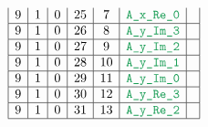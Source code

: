 \begin{figure}[h!]
\begin{adjustwidth}{-2cm}{-2cm}
{\[\begin{array}{|c|c|c|c|c|c|c|}
                    9                      & 1                                       & 0                                         & 25                     & 7                   & \locAXReZero  &                                                                                                                                                                   \\ \hline
                    9                      & 1                                       & 0                                         & 26                     & 8                   & \locAYImThree &                                                                                                                                                                   \\ \hline
                    9                      & 1                                       & 0                                         & 27                     & 9                   & \locAYImTwo   &                                                                                                                                                                   \\ \hline
                    9                      & 1                                       & 0                                         & 28                     & 10                  & \locAYImOne   &                                                                                                                                                                   \\ \hline
                    9                      & 1                                       & 0                                         & 29                     & 11                  & \locAYImZero  &                                                                                                                                                                   \\ \hline
                    9                      & 1                                       & 0                                         & 30                     & 12                  & \locAYReThree &                                                                                                                                                                   \\ \hline
                    9                      & 1                                       & 0                                         & 31                     & 13                  & \locAYReTwo   &                                                                                                                                                                   \\ \hline

\end{array}\]}
\end{adjustwidth}
\end{figure}
